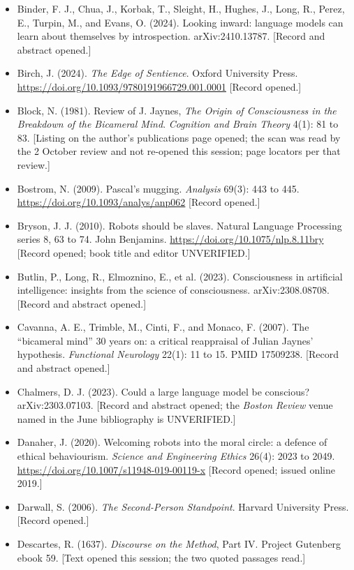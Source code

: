 \documentclass[11pt]{article}
\begin{document}
\begin{itemize}
\item Binder, F. J., Chua, J., Korbak, T., Sleight, H., Hughes, J., Long, R., Perez, E., Turpin, M., and Evans, O. (2024). Looking inward: language models can learn about themselves by introspection. arXiv:2410.13787. [Record and abstract opened.]
\item Birch, J. (2024). \emph{The Edge of Sentience}. Oxford University Press. \url{https://doi.org/10.1093/9780191966729.001.0001} [Record opened.]
\item Block, N. (1981). Review of J. Jaynes, \emph{The Origin of Consciousness in the Breakdown of the Bicameral Mind}. \emph{Cognition and Brain Theory} 4(1): 81 to 83. [Listing on the author's publications page opened; the scan was read by the 2 October review and not re-opened this session; page locators per that review.]
\item Bostrom, N. (2009). Pascal's mugging. \emph{Analysis} 69(3): 443 to 445. \url{https://doi.org/10.1093/analys/anp062} [Record opened.]
\item Bryson, J. J. (2010). Robots should be slaves. Natural Language Processing series 8, 63 to 74. John Benjamins. \url{https://doi.org/10.1075/nlp.8.11bry} [Record opened; book title and editor UNVERIFIED.]
\item Butlin, P., Long, R., Elmoznino, E., et al. (2023). Consciousness in artificial intelligence: insights from the science of consciousness. arXiv:2308.08708. [Record and abstract opened.]
\item Cavanna, A. E., Trimble, M., Cinti, F., and Monaco, F. (2007). The ``bicameral mind'' 30 years on: a critical reappraisal of Julian Jaynes' hypothesis. \emph{Functional Neurology} 22(1): 11 to 15. PMID 17509238. [Record and abstract opened.]
\item Chalmers, D. J. (2023). Could a large language model be conscious? arXiv:2303.07103. [Record and abstract opened; the \emph{Boston Review} venue named in the June bibliography is UNVERIFIED.]
\item Danaher, J. (2020). Welcoming robots into the moral circle: a defence of ethical behaviourism. \emph{Science and Engineering Ethics} 26(4): 2023 to 2049. \url{https://doi.org/10.1007/s11948-019-00119-x} [Record opened; issued online 2019.]
\item Darwall, S. (2006). \emph{The Second-Person Standpoint}. Harvard University Press. [Record opened.]
\item Descartes, R. (1637). \emph{Discourse on the Method}, Part IV. Project Gutenberg ebook 59. [Text opened this session; the two quoted passages read.]

\end{itemize}
\end{document}
